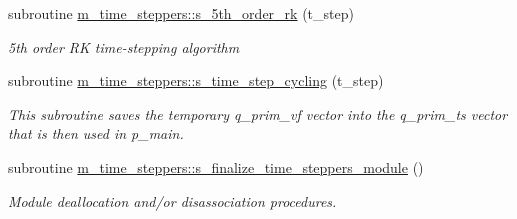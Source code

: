 \begin{DoxyCompactItemize}
subroutine \hyperlink{namespacem__time__steppers_a4920633ffe7f703c3827b956b21b7417}{m\+\_\+time\+\_\+steppers\+::s\+\_\+5th\+\_\+order\+\_\+rk} (t\+\_\+step)
\begin{DoxyCompactList}\small\item\em 5th order RK time-\/stepping algorithm \end{DoxyCompactList}\item 
subroutine \hyperlink{namespacem__time__steppers_a575aa7f95bf96994f49d81d71d19c192}{m\+\_\+time\+\_\+steppers\+::s\+\_\+time\+\_\+step\+\_\+cycling} (t\+\_\+step)
\begin{DoxyCompactList}\small\item\em This subroutine saves the temporary q\+\_\+prim\+\_\+vf vector into the q\+\_\+prim\+\_\+ts vector that is then used in p\+\_\+main. \end{DoxyCompactList}\item 
subroutine \hyperlink{namespacem__time__steppers_aa065ccea3fd76bafc98da7cea5d50416}{m\+\_\+time\+\_\+steppers\+::s\+\_\+finalize\+\_\+time\+\_\+steppers\+\_\+module} ()
\begin{DoxyCompactList}\small\item\em Module deallocation and/or disassociation procedures. \end{DoxyCompactList}\end{DoxyCompactItemize}
